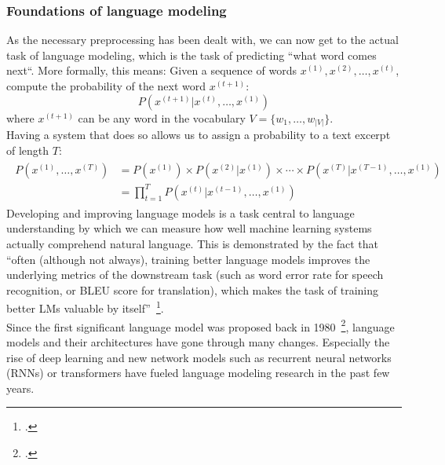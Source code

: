 \subsubsection{Foundations of language modeling}
\label{sub:foundations_of_language_modeling}

As the necessary preprocessing has been dealt with, we can now get to the actual task of language modeling, which is the task of predicting “what word comes next“. More formally, this means: Given a sequence of words $ x^{(1)}, x^{(2)}, \dots, x^{(t)} $, compute the probability of the next word $ x^{(t+1)} $:
\begin{equation}
    P(x^{(t+1)} | x^{(t)}, \dots, x^{(1)})
\end{equation}
where $ x^{(t+1)} $ can be any word in the vocabulary $ V = \{w_1, \dots, w_{|V|}\} $.  \\
Having a system that does so allows us to assign a probability to a text excerpt of length $ T $:
\begin{align}
    \begin{split}
    P(x^{(1)}, \dots, x^{(T)}) &= P(x^{(1)}) \times P(x^{(2)} | x^{(1)}) \times \cdots \times P(x^{(T)} | x^{(T-1)}, \dots, x^{(1)}) \\
    &= \prod_{t=1}^{T} P(x^{(t)} | x^{(t-1)}, \dots, x^{(1)})
    \end{split}
\end{align}
Developing and improving language models is a task central to language understanding by which we can measure how well machine learning systems actually comprehend natural language. This is demonstrated by the fact that “often (although not always), training better language models improves the underlying metrics of the downstream task (such as word error rate for speech recognition, or BLEU score for translation), which makes the task of training better LMs valuable by itself”~\footcite{DBLP:journals/corr/JozefowiczVSSW16}. \\
Since the first significant language model was proposed back in 1980~\footcite{880083}, language models and their architectures have gone through many changes. Especially the rise of deep learning and new network models such as recurrent neural networks (RNNs) or transformers have fueled language modeling research in the past few years.
